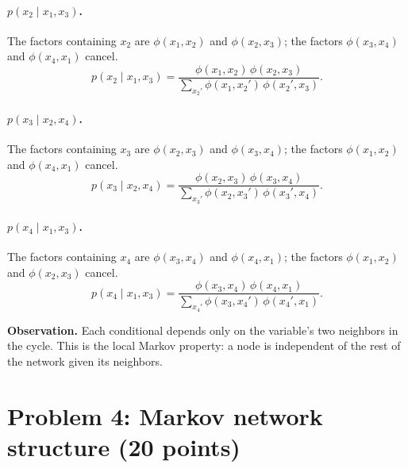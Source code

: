 \documentclass[11pt]{article}
\begin{document}
\paragraph{$p(x_2 \mid x_1, x_3)$.}
The factors containing $x_2$ are $\phi(x_1,x_2)$ and $\phi(x_2,x_3)$; the
factors $\phi(x_3,x_4)$ and $\phi(x_4,x_1)$ cancel.
\[
  p(x_2 \mid x_1, x_3)
  = \frac{\phi(x_1,x_2)\,\phi(x_2,x_3)}{\sum_{x_2'}\phi(x_1,x_2')\,\phi(x_2',x_3)} .
\]

\paragraph{$p(x_3 \mid x_2, x_4)$.}
The factors containing $x_3$ are $\phi(x_2,x_3)$ and $\phi(x_3,x_4)$; the
factors $\phi(x_1,x_2)$ and $\phi(x_4,x_1)$ cancel.
\[
  p(x_3 \mid x_2, x_4)
  = \frac{\phi(x_2,x_3)\,\phi(x_3,x_4)}{\sum_{x_3'}\phi(x_2,x_3')\,\phi(x_3',x_4)} .
\]

\paragraph{$p(x_4 \mid x_1, x_3)$.}
The factors containing $x_4$ are $\phi(x_3,x_4)$ and $\phi(x_4,x_1)$; the
factors $\phi(x_1,x_2)$ and $\phi(x_2,x_3)$ cancel.
\[
  p(x_4 \mid x_1, x_3)
  = \frac{\phi(x_3,x_4)\,\phi(x_4,x_1)}{\sum_{x_4'}\phi(x_3,x_4')\,\phi(x_4',x_1)} .
\]

\textbf{Observation.} Each conditional depends only on the variable's two
neighbors in the cycle. This is the local Markov property: a node is
independent of the rest of the network given its neighbors.

\section*{Problem 4: Markov network structure (20 points)}

\begin{center}
\end{center}
\end{document}
